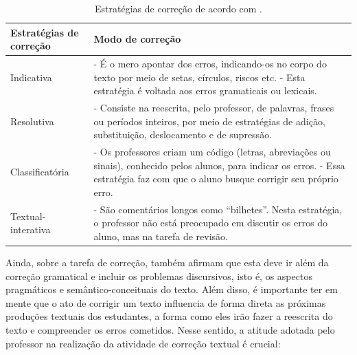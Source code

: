 \documentclass[portuguese]{textolivre}
\begin{document}
\begin{table}[h!]
\centering
\begin{threeparttable}
\caption{Estratégias de correção de acordo com \textcite{ruiz2015}.}\label{tab-1}
\begin{tabular}{p{3.5cm} p{10cm}}
\toprule
Estratégias de correção & Modo de correção \\
\midrule

Indicativa 
& - É o mero apontar dos erros, indicando-os no corpo do texto por meio de setas, círculos, riscos etc. \newline
  - Esta estratégia é voltada aos erros gramaticais ou lexicais. \\

\addlinespace

Resolutiva 
& - Consiste na reescrita, pelo professor, de palavras, frases ou períodos inteiros, por meio de estratégias de adição, substituição, deslocamento e de supressão. \\

\addlinespace

Classificatória 
& - Os professores criam um código (letras, abreviações ou sinais), conhecido pelos alunos, para indicar os erros. \newline
  - Essa estratégia faz com que o aluno busque corrigir seu próprio erro. \\

\addlinespace

Textual-interativa 
& - São comentários longos como ``bilhetes''. Nesta estratégia, o professor não está preocupado em discutir os erros do aluno, mas na tarefa de revisão. \\

\bottomrule
\end{tabular}
\end{threeparttable}
\end{table}

Ainda, sobre a tarefa de correção, \textcite{ruiz2015, conceicao2004} também afirmam que esta deve ir além da correção gramatical e incluir os problemas discursivos, isto é, os aspectos pragmáticos e semântico-conceituais do texto. Além disso, é importante ter em mente que o ato de corrigir um texto influencia de forma direta as próximas produções textuais dos estudantes, a forma como eles irão fazer a reescrita do texto e compreender os erros cometidos. Nesse sentido, a atitude adotada pelo professor na realização da atividade de correção textual é crucial:
\end{document}
